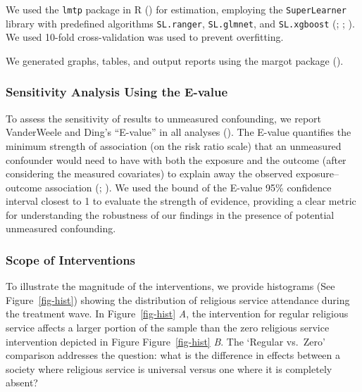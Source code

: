 \documentclass[
  single column]{article}
\begin{document}
We used the \texttt{lmtp} package in R
() for estimation,
employing the \texttt{SuperLearner} library with predefined algorithms
\texttt{SL.ranger}, \texttt{SL.glmnet}, and \texttt{SL.xgboost}
(;
;
). We used 10-fold
cross-validation was used to prevent overfitting.

We generated graphs, tables, and output reports using the margot package
().

\subsubsection{Sensitivity Analysis Using the
E-value}\label{sensitivity-analysis-using-the-e-value}

To assess the sensitivity of results to unmeasured confounding, we
report VanderWeele and Ding's ``E-value'' in all analyses
(). The E-value
quantifies the minimum strength of association (on the risk ratio scale)
that an unmeasured confounder would need to have with both the exposure
and the outcome (after considering the measured covariates) to explain
away the observed exposure--outcome association
(;
). We used
the bound of the E-value 95\% confidence interval closest to 1 to
evaluate the strength of evidence, providing a clear metric for
understanding the robustness of our findings in the presence of
potential unmeasured confounding.

\subsubsection{Scope of Interventions}\label{scope-of-interventions}

To illustrate the magnitude of the interventions, we provide histograms
(See Figure~\ref{fig-hist}) showing the distribution of religious
service attendance during the treatment wave. In Figure~\ref{fig-hist}
\emph{A}, the intervention for regular religious service affects a
larger portion of the sample than the zero religious service
intervention depicted in Figure Figure~\ref{fig-hist} \emph{B}. The
`Regular vs.~Zero' comparison addresses the question: what is the
difference in effects between a society where religious service is
universal versus one where it is completely absent?
\end{document}
